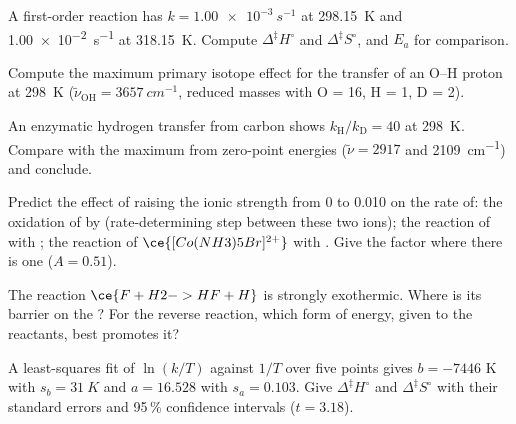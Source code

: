 \begin{exercise}[$\star\star$]\label{exo:b3:rate-theories:5}
A first-order reaction has $k = \qty{1.00e-3}{s^{-1}}$ at \qty{298.15}{K} and \qty{1.00e-2}{s^{-1}} at
\qty{318.15}{K}. Compute $\Delta^{\ddagger}H^\circ$ and $\Delta^{\ddagger}S^\circ$, and $E_a$ for comparison.
\end{exercise}

\begin{exercise}[$\star\star$]\label{exo:b3:rate-theories:6}
Compute the maximum primary isotope effect for the transfer of an O--H proton at
\qty{298}{K} ($\tilde\nu_{\mathrm{OH}} = \qty{3657}{cm^{-1}}$, reduced masses with O = 16, H = 1, D = 2).
\end{exercise}

\begin{exercise}[$\star\star$]\label{exo:b3:rate-theories:7}
An enzymatic hydrogen transfer from carbon shows $k_{\mathrm H}/k_{\mathrm D} = 40$ at \qty{298}{K}. Compare
with the maximum from zero-point energies ($\tilde\nu = 2917$ and \qty{2109}{cm^{-1}}) and conclude.
\end{exercise}

\begin{exercise}[$\star\star$]\label{exo:b3:rate-theories:8}
Predict the effect of raising the ionic strength from 0 to 0.010 on the rate
of: the oxidation of  by  (rate-determining step between these two ions); the
reaction of  with ; the reaction of $\ce{[Co(NH3)5Br]^{2+}}$ with .
Give the factor where there is one ($A = 0.51$).
\end{exercise}

\begin{exercise}[$\star\star$]\label{exo:b3:rate-theories:9}
The reaction $\ce{F + H2 -> HF + H}$ is strongly exothermic. Where is its barrier on the
? For the reverse reaction, which form of energy, given
to the reactants, best promotes it?
\end{exercise}

\begin{exercise}[$\star\star\star$]\label{exo:b3:rate-theories:10}
A least-squares fit of $\ln(k/T)$ against $1/T$ over five points gives $b = -7446$ K
with $s_b = \qty{31}{K}$ and $a = 16.528$ with $s_a = 0.103$. Give $\Delta^{\ddagger}H^\circ$ and $\Delta^{\ddagger}S^\circ$ with
their standard errors and 95\,\% confidence intervals ($t = 3.18$).
\end{exercise}

